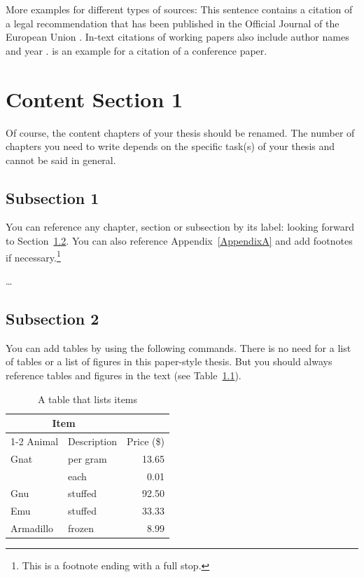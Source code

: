 More examples for different types of sources: This sentence contains a citation of a legal recommendation that has been published in  the Official Journal of the European Union \citep{ec2013}. In-text citations of working papers also include author names and year \citep[see, for example,][]{kraemer2016}. \citet{breuer2015} is an example for a citation of a conference paper.


\chapter{Content Section 1} %
\label{ch:section1}

Of course, the content chapters of your thesis should be renamed. The number of chapters you need to write depends on the specific task(s) of your thesis and cannot be said in general.


\section{Subsection 1}
\label{ch:section1:sec:subsection1}

You can reference any chapter, section or subsection by its label: looking forward to Section~\ref{ch:section1:sec:subsection2}. You can also reference Appendix~\ref{AppendixA} and add footnotes if necessary.\footnote{This is a footnote ending with a full stop.} 

\dots

\section{Subsection 2}
\label{ch:section1:sec:subsection2}
You can add tables by using the following commands. There is no need for a list of tables or a list of figures in this paper-style thesis. But you should always reference tables and figures in the text (see Table~\ref{tab:prices}). 
\begin{table}[htb]%
	\centering
	\begin{tabular}{llr}
		\toprule
		\multicolumn{2}{c}{Item} \\
		\cmidrule(r){1-2}
		Animal    & Description & Price (\$) \\
		\midrule
		Gnat      & per gram    & 13.65      \\
		& each        & 0.01       \\
		Gnu       & stuffed     & 92.50      \\
		Emu       & stuffed     & 33.33      \\
		Armadillo & frozen      & 8.99       \\
		\bottomrule
	\end{tabular}
	\caption{A table that lists items \citep[based on][]{Becker2009}}
	\label{tab:prices}
\end{table}


